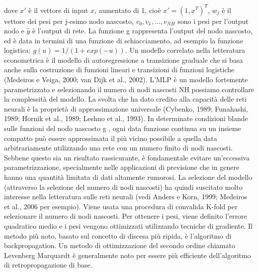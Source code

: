 \documentclass[12pt,a4paper]{report}
\begin{document}
dove $x'$ è il vettore di input $x$, aumentato di 1, cioè $ x' = (1, x^T )^T  $, $w_j$  è il vettore dei pesi per j-esimo nodo nascosto, $v_0, v_1, ..., v_{NH}$ sono i pesi per l'output nodo e $\hat{y}$ è l'output di rete. La funzione g rappresenta l'output del nodo nascosto, ed è data in termini di una funzione di schiacciamento, ad esempio la funzione logistica:
$g(u) = 1/(1 + exp(-u))$. 
Un modello correlato nella letteratura econometrica è il modello di autoregressione a transizione graduale che si basa anche sulla costruzione di funzioni lineari e transizioni di funzioni logistiche (Medeiros e Veiga, 2000; van Dijk et al., 2002).
L'MLP è un modello fortemente parametrizzato e selezionando il numero di nodi nascosti NH possiamo controllare la complessità del modello. La svolta che ha dato credito alla capacità delle reti neurali è la proprietà di approssimazione universale (Cybenko, 1989; Funahashi, 1989; Hornik et al., 1989; Leshno et al., 1993). In determinate condizioni blande sulle funzioni del nodo nascosto g , ogni data funzione continua su un insieme compatto può essere approssimata il più vicino possibile a quella data arbitrariamente utilizzando una rete con un numero finito di nodi nascosti. Sebbene questo sia un risultato rassicurante, è fondamentale evitare un'eccessiva parametrizzazione, specialmente nelle applicazioni di previsione che in genere hanno una quantità limitata di dati altamente rumorosi. La selezione del modello (attraverso la selezione del numero di nodi nascosti) ha quindi suscitato molto interesse nella letteratura sulle reti neurali (vedi Anders e Korn, 1999; Medeiros et al., 2006 per esempio). Viene usata una procedura di convalida K-fold per selezionare il numero di nodi nascosti.
Per ottenere i pesi, viene definito l'errore quadratico medio e i pesi vengono ottimizzati utilizzando tecniche di gradiente. Il metodo più noto, basato sul concetto di discesa più ripida, è l'algoritmo di backpropagation. Un metodo di ottimizzazione del secondo ordine chiamato Levenberg Marquardt è generalmente noto per essere più efficiente dell'algoritmo di retropropagazione di base.
\end{document}
